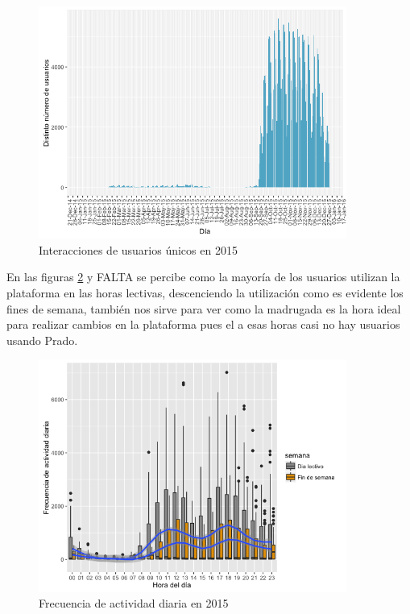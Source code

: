 \begin{figure}[H]
\centering
\includegraphics[width=0.9\textwidth]{../r/distintonumerousuarios_2015}
\caption{Interacciones de usuarios únicos en 2015}
\label{fig:distintonumerousuarios_2015}
\end{figure}

En las figuras \ref{fig:frecuenciaactividaddiaria_2015} y FALTA se percibe como la mayoría de los usuarios utilizan la plataforma en las horas lectivas, descenciendo la utilización como es evidente los fines de semana, también nos sirve para ver como la madrugada es la hora ideal para realizar cambios en la plataforma pues el a esas horas casi no hay usuarios usando Prado.

\begin{figure}[H]
\centering
\includegraphics[width=0.9\textwidth]{../r/frecuenciaactividaddiaria_2015}
\caption{Frecuencia de actividad diaria en 2015}
\label{fig:frecuenciaactividaddiaria_2015}
\end{figure}


